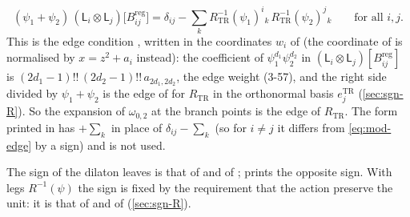 \begin{prop}
\begin{enumerate}
\begin{equation}
\label{eq:mod-edge}
(\psi_1+\psi_2)\,(\mathsf L_i\otimes\mathsf L_j)\bigl[B^{\mathrm{reg}}_{ij}\bigr]=\delta_{ij}-\sum_kR_{\mathrm{TR}}^{-1}(\psi_1)^i{}_k\,R_{\mathrm{TR}}^{-1}(\psi_2)^j{}_k\qquad\text{for all }i,j .
\end{equation}
This is the edge condition \cite[(4-1), with (3-2) and (3-57)]{DuninBarkowski:2012bw}, written in the coordinates $w_i$ of \cite[\S2.6]{Dunin-Barkowski:2015caa} (the coordinate of \cite[(3-1)]{DuninBarkowski:2012bw} is normalised by $x=z^2+a_i$ instead): the coefficient of $\psi_1^{d_1}\psi_2^{d_2}$ in $(\mathsf L_i\otimes\mathsf L_j)[B^{\mathrm{reg}}_{ij}]$ is $(2d_1-1)!!\,(2d_2-1)!!\,a_{2d_1,2d_2}$, the edge weight (3-57), and the right side divided by $\psi_1+\psi_2$ is the edge of \cite[Def.~2.2]{PPZ15} for $R_{\mathrm{TR}}$ in the orthonormal basis $e^{\mathrm{TR}}_j$ (\cref{sec:sgn-R}). So the expansion of $\omega_{0,2}$ at the branch points is the edge of $R_{\mathrm{TR}}$. The form printed in \cite[(2-33)]{Dunin-Barkowski:2015caa} has $+\sum_k$ in place of $\delta_{ij}-\sum_k$ (so for $i\neq j$ it differs from \eqref{eq:mod-edge} by a sign) and is not used.
\end{enumerate}
\end{prop}

The sign of the dilaton leaves is that of \cite[\S2.3]{DuninBarkowski:2012bw} and of \cite[Prop.~2.12, Def.~2.13]{PPZ15}; \cite[\S2.3]{Dunin-Barkowski:2015caa} prints the opposite sign. With legs $R^{-1}(\psi)$ the sign is fixed by the requirement that the action preserve the unit: it is that of \cite[(2-23)]{DuninBarkowski:2012bw} and of \cite[Prop.~2.12]{PPZ15} (\cref{sec:sgn-R}).



